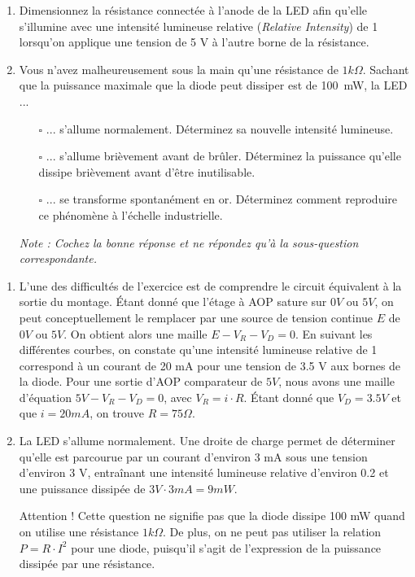 \documentclass{../template/tp}
\begin{document}
\Question
{
\begin{enumerate}
\item Dimensionnez la résistance connectée à l'anode de la LED afin qu'elle s'illumine avec une intensité lumineuse relative (\textit{Relative Intensity}) de 1 lorsqu'on applique une tension de 5 V à l'autre borne de la résistance.

\item Vous n'avez malheureusement sous la main qu'une résistance de $1 k\Omega$.
Sachant que la puissance maximale que la diode peut dissiper est de 100~mW, la LED ...
    \begin{itemize}
    \item[$\square$]... s'allume normalement. Déterminez sa nouvelle intensité lumineuse.
    \item[$\square$]... s'allume brièvement avant de brûler. Déterminez la puissance qu'elle dissipe brièvement avant d'être inutilisable.
    \item[$\square$]... se transforme spontanément en or. Déterminez comment reproduire ce phénomène à l'échelle industrielle.
    \end{itemize}
\textit{Note : Cochez la bonne réponse et ne répondez qu'à la sous-question correspondante.}
\end{enumerate}

}
{
\begin{enumerate}
\item L'une des difficultés de l'exercice est de comprendre le circuit équivalent à la sortie du montage.
Étant donné que l'étage à AOP sature sur $0 V$ ou $5 V$, on peut conceptuellement le remplacer par une source de tension continue $E$ de $0 V$ ou $5 V$.
On obtient alors une maille $E - V_R - V_D = 0$.
En suivant les différentes courbes, on constate qu'une intensité lumineuse relative de 1 correspond à un courant de 20 mA pour une tension de 3.5 V aux bornes de la diode.
Pour une sortie d'AOP comparateur de $5 V$, nous avons une maille d'équation $5V - V_R - V_D = 0$, avec $V_R = i \cdot R$.
Étant donné que $V_D = 3.5 V$ et que $i = 20 mA$, on trouve $R = 75 \Omega$.


\item La LED s'allume normalement. Une droite de charge permet de déterminer qu'elle est parcourue par un courant d'environ 3 mA sous une tension d'environ 3 V, entraînant une intensité lumineuse relative d'environ 0.2 et une puissance dissipée de $3 V \cdot 3 mA = 9 mW$.

Attention ! Cette question ne signifie pas que la diode dissipe 100 mW quand on utilise une résistance $1 k\Omega$.
De plus, on ne peut pas utiliser la relation $P = R\cdot I^2$ pour une diode, puisqu'il s'agit de l'expression de la puissance dissipée par une résistance.
\end{enumerate}
}
\end{document}
